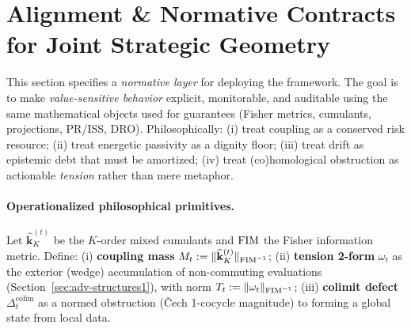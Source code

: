 \section{Alignment \& Normative Contracts for Joint Strategic Geometry}\label{app:alignment1}

\emph{} This section specifies a \emph{normative layer} for deploying the framework. The goal is to make \emph{value-sensitive behavior} explicit, monitorable, and auditable using the same mathematical objects used for guarantees (Fisher metrics, cumulants, projections, PR/ISS, DRO). Philosophically: (i) treat coupling as a conserved risk resource; (ii) treat energetic passivity as a dignity floor; (iii) treat drift as epistemic debt that must be amortized; (iv) treat (co)homological obstruction as actionable \emph{tension} rather than mere metaphor.

\paragraph{Operationalized philosophical primitives.} Let $\widehat{\mathbf k}_K^{(t)}$ be the $K$-order mixed cumulants and $\mathrm{FIM}$ the Fisher information metric. Define: (i) \textbf{coupling mass} $M_t:=\|\widehat{\mathbf k}_K^{(t)}\|_{\mathrm{FIM}^{-1}}$; (ii) \textbf{tension 2-form} $\omega_t$ as the exterior (wedge) accumulation of non-commuting evaluations (Section~\ref{sec:adv-structures1}), with norm $T_t:=\|\omega_t\|_{\mathrm{FIM}^{-1}}$; (iii) \textbf{colimit defect} $\Delta^{\mathrm{colim}}_t$ as a normed obstruction (\v{C}ech 1-cocycle magnitude) to forming a global state from local data.

